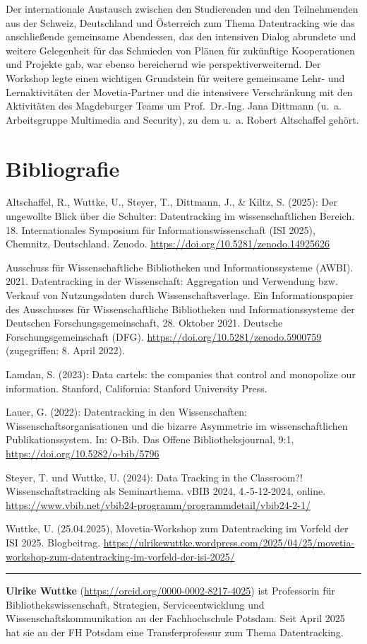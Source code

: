 \documentclass[a4paper,
fontsize=11pt,
oneside,
numbers=noperiodatend,
parskip=half-,
bibliography=totoc,
final
]{scrartcl}
\begin{document}
Der internationale Austausch zwischen den Studierenden und den
Teilnehmenden aus der Schweiz, Deutschland und Österreich zum Thema
Datentracking wie das anschließende gemeinsame Abendessen, das den
intensiven Dialog abrundete und weitere Gelegenheit für das Schmieden
von Plänen für zukünftige Kooperationen und Projekte gab, war ebenso
bereichernd wie perspektiverweiternd. Der Workshop legte einen wichtigen
Grundstein für weitere gemeinsame Lehr- und Lernaktivitäten der
Movetia-Partner und die intensivere Verschränkung mit den Aktivitäten
des Magdeburger Teams um Prof.~Dr.-Ing. Jana Dittmann (u.~a.
Arbeitsgruppe Multimedia and Security), zu dem u.~a. Robert Altschaffel
gehört.

\section{Bibliografie}\label{bibliografie}

Altschaffel, R., Wuttke, U., Steyer, T., Dittmann, J., \& Kiltz, S.
(2025): Der ungewollte Blick über die Schulter: Datentracking im
wissenschaftlichen Bereich. 18. Internationales Symposium für
Informationswissenschaft (ISI 2025), Chemnitz, Deutschland. Zenodo.
\url{https://doi.org/10.5281/zenodo.14925626}

Ausschuss für Wissenschaftliche Bibliotheken und Informationssysteme
(AWBI). 2021. Datentracking in der Wissenschaft: Aggregation und
Verwendung bzw. Verkauf von Nutzungsdaten durch Wissenschaftsverlage.
Ein Informationspapier des Ausschusses für Wissenschaftliche
Bibliotheken und Informationssysteme der Deutschen
Forschungsgemeinschaft, 28. Oktober 2021. Deutsche
Forschungsgemeinschaft (DFG).
\url{https://doi.org/10.5281/zenodo.5900759} (zugegriffen: 8. April
2022).

Lamdan, S. (2023): Data cartels: the companies that control and
monopolize our information. Stanford, California: Stanford University
Press.

Lauer, G. (2022): Datentracking in den Wissenschaften:
Wissenschaftsorganisationen und die bizarre Asymmetrie im
wissenschaftlichen Publikationssystem. In: O-Bib. Das Offene
Bibliotheksjournal, 9:1, \url{https://doi.org/10.5282/o-bib/5796}

Steyer, T. und Wuttke, U. (2024): Data Tracking in the Classroom?!
Wissenschaftstracking als Seminarthema. vBIB 2024, 4.-5-12-2024, online.
\url{https://www.vbib.net/vbib24-programm/programmdetail/vbib24-2-1/}

Wuttke, U. (25.04.2025), Movetia-Workshop zum Datentracking im Vorfeld
der ISI 2025. Blogbeitrag.
\url{https://ulrikewuttke.wordpress.com/2025/04/25/movetia-workshop-zum-datentracking-im-vorfeld-der-isi-2025/}

\begin{center}\rule{0.5\linewidth}{0.5pt}\end{center}

\textbf{Ulrike Wuttke} (\url{https://orcid.org/0000-0002-8217-4025}) ist
Professorin für Bibliothekswissenschaft, Strategien, Serviceentwicklung
und Wissenschaftskommunikation an der Fachhochschule Potsdam. Seit April
2025 hat sie an der FH Potsdam eine Transferprofessur zum Thema
Datentracking.
\end{document}
